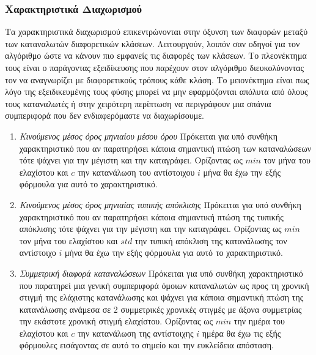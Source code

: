 \subsubsection{Χαρακτηριστικά Διαχωρισμού}
Τα χαρακτηριστικά διαχωρισμού επικεντρώνονται στην όξυνση των διαφορών μεταξύ των καταναλωτών διαφορετικών κλάσεων. Λειτουργούν, λοιπόν σαν οδηγοί για τον αλγόριθμο ώστε να κάνουν πιο εμφανείς τις διαφορές των κλάσεων. Το πλεονέκτημα τους είναι ο παράγοντας εξειδίκευσης που παρέχουν στον αλγόριθμο διευκολύνοντας τον να αναγνωρίζει με διαφορετικούς τρόπους κάθε κλάση. Το μειονέκτημα είναι πως λόγο της εξειδικευμένης τους φύσης μπορεί να μην εφαρμόζονται απόλυτα από όλους τους καταναλωτές ή στην χειρότερη περίπτωση να περιγράφουν μια σπάνια συμπεριφορά που δεν ενδιαφερόμαστε να διαχωρίσουμε.
\begin{enumerate}
\item{\textit{Κινούμενος μέσος όρος μηνιαίου μέσου όρου}} Πρόκειται για υπό συνθήκη χαρακτηριστικό που αν παρατηρήσει κάποια σημαντική πτώση των καταναλώσεων τότε ψάχνει για την μέγιστη και την καταγράφει. Ορίζοντας ως $min$ τον μήνα του ελαχίστου και $c$ την κατανάλωση του αντίστοιχου $i$ μήνα θα έχω την εξής φόρμουλα για αυτό το χαρακτηριστικό. 
\begin{center}
\end{center}
\item{\textit{Κινούμενος μέσος όρος μηνιαίας τυπικής απόκλισης}} Πρόκειται για υπό συνθήκη χαρακτηριστικό που αν παρατηρήσει κάποια σημαντική πτώση της τυπικής απόκλισης τότε ψάχνει για την μέγιστη και την καταγράφει. Ορίζοντας ως $min$ τον μήνα του ελαχίστου και $std$ την τυπική απόκλιση της κατανάλωσης τον αντίστοιχο $i$ μήνα θα έχω την εξής φόρμουλα για αυτό το χαρακτηριστικό. 
\begin{center}
\end{center}
\item{\textit{Συμμετρική διαφορά καταναλώσεων}} Πρόκειται για υπό συνθήκη χαρακτηριστικό που παρατηρεί μια γενική συμπεριφορά όμοιων καταναλωτών ως προς τη χρονική στιγμή της ελάχιστης κατανάλωσης και ψάχνει για κάποια σημαντική πτώση της κατανάλωσης ανάμεσα σε 2 συμμετρικές χρονικές στιγμές με άξονα συμμετρίας την εκάστοτε χρονική στιγμή ελαχίστου. Ορίζοντας ως $min$ την ημέρα του ελαχίστου και $c$ την κατανάλωση της αντίστοιχης $i$ ημέρα θα έχω τις εξής φόρμουλες εισάγοντας σε αυτό το σημείο και την ευκλείδεια απόσταση.

\end{enumerate}
